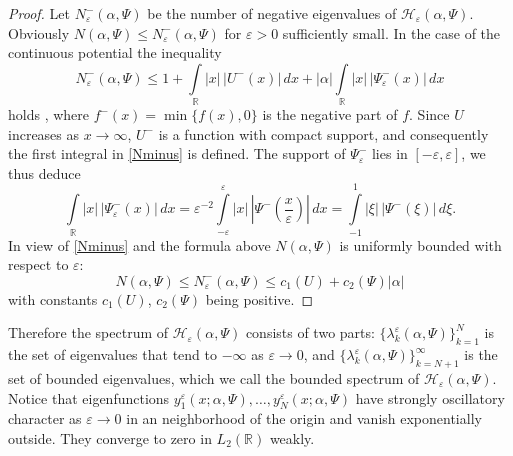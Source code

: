 \documentclass[11pt,english]{amsart}%
\begin{document}
\begin{proof}
Let $N_\varepsilon^-(\alpha,\Psi)$ be the number of negative eigenvalues of $\mathcal{H}_{\varepsilon}(\alpha,\Psi)$.
Obviously $N(\alpha,\Psi)\leq N_\varepsilon^-(\alpha,\Psi)$ for $\varepsilon>0$ sufficiently small.
In the case of the continuous potential the inequality
\begin{equation}\label{Nminus}
   N_\varepsilon^-(\alpha,\Psi)\leq 1+\int\limits_{\mathbb R} |x|\,|U^-(x)|\,dx+|\alpha|\int\limits_{\mathbb R} |x|\,|\Psi^-_\varepsilon(x)|\,dx
\end{equation}
holds \cite[p.97]{BS}, where $f^-(x)=\min\{f(x), 0\}$ is the negative part of $f$.
Since $U$
increases as $x\to \infty$, $U^-$ is a function with compact support, and consequently
the first integral in \eqref{Nminus} is defined.
The support of $\Psi^-_\varepsilon$ lies in $[-\varepsilon,\varepsilon]$, we thus deduce
\begin{equation*}
\int\limits_{\mathbb R}
|x|\,|\Psi^-_\varepsilon(x)|\,dx=\varepsilon^{-2}\int\limits_{-\varepsilon}^{\varepsilon}
|x|\,|\Psi^-(\frac{x}{\varepsilon})|\,dx= \int\limits_{-1}^{1} |\xi|\,|\Psi^-(\xi)|\,d\xi.
\end{equation*}
In view of \eqref{Nminus} and the formula above
$N(\alpha,\Psi)$ is uniformly bounded with respect to  $\varepsilon$:
$$N(\alpha,\Psi)\leq N_\varepsilon^-(\alpha,\Psi)\leq c_1(U)+c_2(\Psi)|\alpha|$$
with constants $c_1(U)$, $c_2(\Psi)$  being positive.
\end{proof}

Therefore   the spectrum of $\mathcal{H_{\varepsilon}}(\alpha,\Psi)$ consists of two parts:
$\{\lambda_k^\varepsilon(\alpha, \Psi)\}_{k=1}^N$ is the set of eigenvalues that tend to $-\infty$ as $\varepsilon\to 0$, and
$\{\lambda_k^\varepsilon(\alpha, \Psi)\}_{k=N+1}^\infty$ is the set of bounded eigenvalues,
which we  call the bounded spectrum of $\mathcal{H_{\varepsilon}}(\alpha,\Psi)$. Notice that
eigenfunctions $y_1^\varepsilon(x;\alpha, \Psi), \dots, y_N^\varepsilon(x;\alpha, \Psi)$ have strongly oscillatory character as $\varepsilon\to 0$ in an neighborhood of the origin and vanish exponentially outside.
They converge to zero in $L_2(\mathbb{R})$ weakly.
\end{document}
